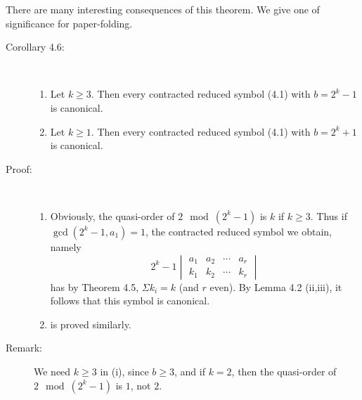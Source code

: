There are many interesting consequences of this theorem. We give one of significance for paper-folding.

\begin{description}

  \item[Corollary 4.6:] $\ $
    \begin{enumerate}[\hspace{1cm}(i)]
      \item Let $k \geq 3$. Then every contracted reduced symbol (4.1) with $b = 2^{k}-1$ is canonical.
      \item Let $k \geq 1$. Then every contracted reduced symbol (4.1) with $b = 2^{k}+1$ is canonical.
    \end{enumerate}

  \item[Proof:] $\ $
    \begin{enumerate}[\hspace{1cm}(i)]
      \item Obviously, the quasi-order of $2 \mod{(2^{k}-1)}$ is $k$ if $k \geq 3$. Thus if $\gcd (2^{k}-1, a_{1}) = 1$, the contracted reduced symbol we obtain, namely
        \begin{equation}
        2^{k}-1 \begin{vmatrix}
        a_{1} & a_{2} & \cdots & a_{r} \\
        k_{1} & k_{2} & \cdots & k_{r}
        \end{vmatrix}  \tag{4.7}
        \end{equation}
        has by Theorem 4.5, $\Sigma k_{i} = k$ (and $r$ even). By Lemma 4.2 (ii,iii), it follows that this symbol is canonical. 
      \item is proved similarly.
    \end{enumerate}

  \item[Remark:] We need $k \geq 3$ in (i), since $b \geq 3$, and if $k = 2$, then the quasi-order of $2 \mod{(2^{k}-1)}$ is $1$, not $2$.


\end{description}
